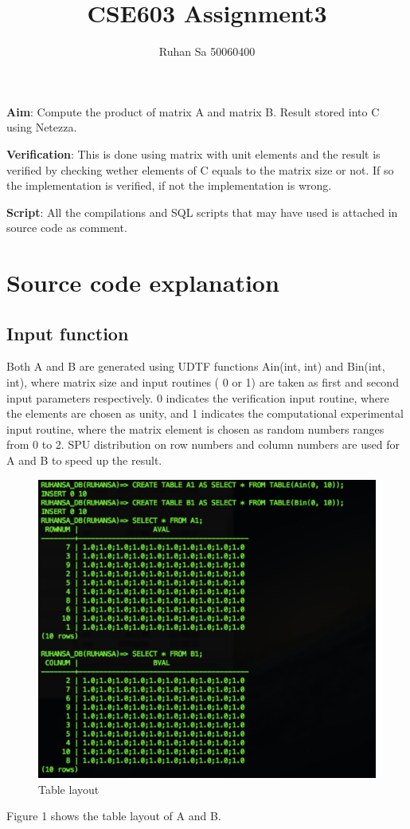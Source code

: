 \documentclass {article}
\begin{document}
\title{CSE603 Assignment3}
\author {Ruhan Sa 50060400}
\maketitle
\noindent \textbf{Aim}: Compute the product of matrix A and matrix B. Result stored into C using Netezza.

\noindent \textbf{Verification}:  This is done using matrix with unit elements and the result is verified by checking wether elements of C equals to the matrix size or not. If so the implementation is verified, if not the implementation is wrong.

\noindent \textbf{Script}: All the compilations and SQL scripts that may have used is attached in source code as comment.

\section{Source code explanation}
\subsection{Input function}
Both A and B are generated using UDTF functions Ain(int, int) and Bin(int, int), where matrix size and input routines ( 0 or 1) are taken as first and second input parameters respectively. 0 indicates the verification input routine, where the elements are chosen as unity, and 1 indicates the computational experimental input routine, where the matrix element is chosen as random numbers ranges from 0 to 2. SPU distribution on row numbers and column numbers are used for A and B to speed up the result. 
\begin{figure}[htp!]
\centering
\includegraphics[width = \linewidth]{1.pdf}
\caption{Table layout}
\label{fig:one}
\end{figure}
Figure 1 shows the table layout of A and B.
\end{document}
